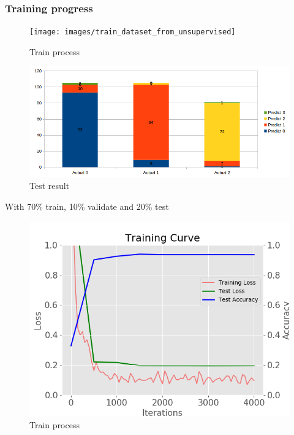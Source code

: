 \documentclass[11pt]{article}
\begin{document}
\subsubsection{Training progress}

\begin{figure}[H]
\centering
\texttt{[image: images/train\_dataset\_from\_unsupervised]}
\caption{Train process}
\end{figure}

\begin{figure}[H]
\centering
\includegraphics[width=1\textwidth]{images/result_dataset_from_unsupervised}
\caption{Test result}
\end{figure}

With 70\% train, 10\% validate and 20\% test

\begin{figure}[H]
\centering
\includegraphics[width=1\textwidth]{images/70_10_20_train_dataset_from_unsupervised}
\caption{Train process}
\end{figure}
\end{document}
